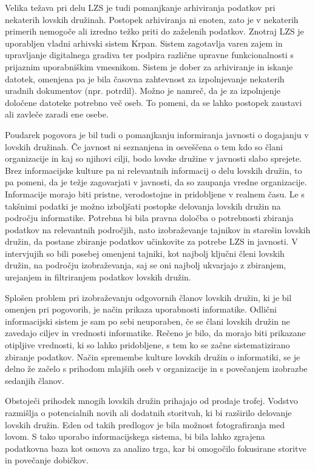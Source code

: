 \documentclass[a4paper,12pt,openright]{book}
\begin{document}
Velika težava pri delu LZS je tudi pomanjkanje arhiviranja podatkov pri nekaterih lovskih družinah. 
Postopek arhiviranja ni enoten, zato je v nekaterih primerih nemogoče ali izredno težko priti do zaželenih podatkov.
Znotraj LZS je uporabljen vladni arhivski sistem Krpan.
Sistem zagotavlja varen zajem in upravljanje digitalnega gradiva ter podpira različne upravne funkcionalnosti s prijaznim uporabniškim vmesnikom.\cite{krpan}
Sistem je dober za arhiviranje in iskanje datotek, omenjena pa je bila časovna zahtevnost za izpolnjevanje nekaterih uradnih dokumentov (npr. potrdil). 
Možno je namreč, da je za izpolnjenje določene datoteke potrebno več oseb. 
To pomeni, da se lahko postopek zaustavi ali zavleče zaradi ene osebe. 

Poudarek pogovora je bil tudi o pomanjkanju informiranja javnosti o dogajanju v lovskih družinah. 
Če javnost ni seznanjena in osveščena o tem kdo so člani organizacije in kaj so njihovi cilji, bodo lovske družine v javnosti slabo sprejete.
Brez informacijske kulture pa ni relevantnih informacij o delu lovskih družin, to pa pomeni, da je težje zagovarjati v javnosti, da so zaupanja vredne organizacije.
Informacije morajo biti pristne, verodostojne in pridobljene v realnem času.
Le s takšnimi podatki je možno izboljšati postopke delovanja lovskih družin na področju informatike.
Potrebna bi bila pravna določba o potrebnosti zbiranja podatkov na relevantnih področjih, nato izobraževanje tajnikov in starešin lovskih družin, da postane zbiranje podatkov učinkovite za potrebe LZS in javnosti.
V intervjujih so bili  posebej omenjeni tajniki, kot najbolj ključni členi lovskih družin, na področju izobraževanja, saj se oni  najbolj ukvarjajo z zbiranjem, urejanjem in filtriranjem podatkov lovskih družin.  

Splošen problem pri izobraževanju odgovornih članov lovskih družin, ki je bil omenjen pri pogovorih, je način prikaza uporabnosti informatike. 
Odlični informacijski sistem je sam po sebi neuporaben, če se člani lovskih družin ne zavedajo ciljev in vrednosti informatike. 
Rečeno je bilo, da morajo biti prikazane otipljive vrednosti, ki so lahko pridobljene, s tem ko se začne sistematizirano zbiranje podatkov. 
Način spremembe kulture lovskih družin o informatiki, se je delno že začelo s prihodom mlajših oseb v organizacije in s povečanjem izobrazbe sedanjih članov.

Obstoječi prihodek mnogih lovskih družin prihajajo od prodaje trofej. 
Vodstvo razmišlja o potencialnih novih ali dodatnih storitvah, ki bi razširilo delovanje lovskih družin. 
Eden od takih predlogov je bila možnost fotografiranja med lovom. 
S tako uporabo informacijskega sistema, bi bila lahko zgrajena podatkovna baza kot osnova za analizo trga, kar bi omogočilo fokusirane storitve in povečanje dobičkov. 
\end{document}
